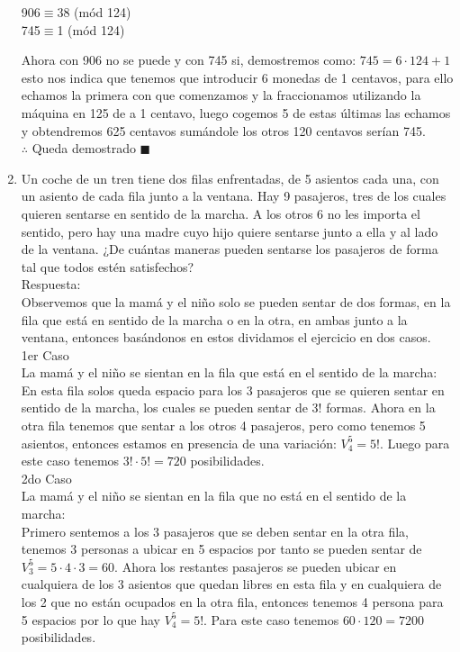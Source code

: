 \documentclass{book}
\begin{document}
\begin{enumerate}
				\begin{center}
				906$\equiv$38 (mód 124)\\
				745$\equiv$1 (mód 124)
				\end{center}
				Ahora con 906 no se puede y con 745 si, demostremos como: $745=6\cdot 124+1$ esto nos indica que tenemos que introducir 6 monedas de 1 centavos, para ello echamos la primera con que comenzamos y la fraccionamos utilizando la máquina en 125 de a 1 centavo, luego cogemos 5 de estas últimas las echamos y obtendremos 625 centavos sumándole los otros 120 centavos serían 745. \\$\therefore$ Queda demostrado $\blacksquare$\\
				\item Un coche de un tren tiene dos filas enfrentadas, de 5 asientos cada una, con un asiento de cada fila junto a la ventana. Hay 9 pasajeros, tres de los cuales quieren sentarse en sentido de la marcha. A los otros 6 no les importa el sentido, pero hay una madre cuyo hijo quiere sentarse junto a ella y al lado de la ventana. ¿De cuántas maneras pueden sentarse los pasajeros de forma tal que todos estén satisfechos?\\
				Respuesta:\\
				Observemos que la mamá y el niño solo se pueden sentar de dos formas, en la fila que está en sentido de la marcha o en la otra, en ambas junto a la ventana, entonces basándonos en estos dividamos el ejercicio en dos casos.\\
				1er Caso\\
				La mamá y el niño se sientan en la fila que está en el sentido de la marcha:\\
				En esta fila solos queda espacio para los 3 pasajeros que se quieren sentar en sentido de la marcha, los cuales se pueden sentar de 3! formas. Ahora en la otra fila tenemos que sentar a los otros 4 pasajeros, pero como tenemos 5 asientos, entonces estamos en presencia de una variación: $V_{4}^{5}=5!$. Luego para este caso tenemos $3!\cdot 5!=720$ posibilidades.\\
				2do Caso\\
				La mamá y el niño se sientan en la fila que no está en el sentido de la marcha:\\
				Primero sentemos a los 3 pasajeros que se deben sentar en la otra fila, tenemos 3 personas a ubicar en 5 espacios por tanto se pueden sentar de $V_{3}^{5}=5\cdot 4\cdot 3=60$. Ahora los restantes pasajeros se pueden ubicar en cualquiera de los 3 asientos que quedan libres en esta fila y en cualquiera de los 2 que no están ocupados en la otra fila, entonces tenemos 4 persona para 5 espacios por lo que hay $V_{4}^{5}=5!$. Para este caso tenemos $60\cdot 120=7200$ posibilidades.\\

\end{enumerate}
\end{document}
